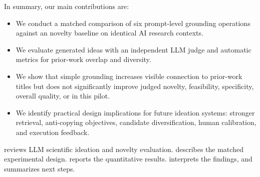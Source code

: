 In summary, our main contributions are:
\begin{itemize}[leftmargin=*,itemsep=0pt,topsep=0pt]
    \item We conduct a matched comparison of six prompt-level grounding operations against an \ungrounded novelty baseline on identical AI research contexts.
    \item We evaluate generated ideas with an independent LLM judge and automatic metrics for prior-work overlap and diversity.
    \item We show that simple grounding increases visible connection to prior-work titles but does not significantly improve judged novelty, feasibility, specificity, overall quality, or \nfprod in this pilot.
    \item We identify practical design implications for future ideation systems: stronger retrieval, anti-copying objectives, candidate diversification, human calibration, and execution feedback.
\end{itemize}

 reviews LLM scientific ideation and novelty evaluation.  describes the matched experimental design.  reports the quantitative results.  interprets the findings, and  summarizes next steps.
